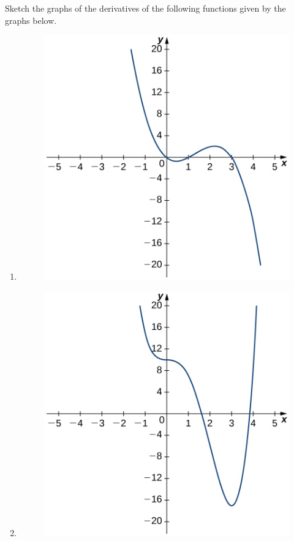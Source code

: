 \documentclass[12pt]{amsart}
\begin{document}
\begin{question}
	Sketch the graphs of the derivatives of the following functions given by the graphs below.
	\begin{enumerate}
		\item
		      \begin{figure}[h!]
			      \includegraphics{figures/1.jpeg}
		      \end{figure}

		\item \begin{figure}[h!]
			      \includegraphics{figures/2.jpeg}
		      \end{figure}
		      \vspace{2cm}


\end{enumerate}
\end{question}
\end{document}

